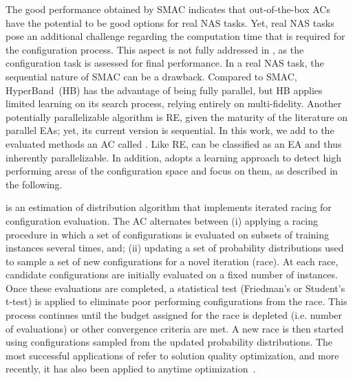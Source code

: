 The good performance obtained by SMAC indicates that out-of-the-box ACs have the potential to be good options for real NAS tasks.
Yet, real NAS tasks pose an additional challenge regarding the computation time that is required for the configuration process. This aspect is not fully addressed in \nasbench, as the configuration task is assessed for final performance. %
In a real NAS task, the sequential nature of SMAC can be a drawback. 
Compared to SMAC, HyperBand~(HB) has the advantage of being fully parallel, but HB applies limited learning on its search process, relying entirely on multi-fidelity. %
Another potentially parallelizable algorithm is RE, given the maturity of  the literature on parallel EAs; yet, its current version is sequential. 
In this work, we add to the evaluated methods an AC called \irace. Like RE, \irace can be classified as an EA and thus inherently parallelizable. In addition, \irace adopts a learning approach to detect high performing areas of the configuration space and focus on them, as described in the following.

\begin{description}[style=unboxed, leftmargin=0px]
\item[\irace] is an estimation of distribution algorithm
that implements iterated racing for configuration
evaluation.  The AC alternates
between (i) applying a racing procedure in which a
set of configurations is evaluated on subsets of training instances several times,
and; (ii) updating a set of probability
distributions used to sample a set of new configurations for a novel iteration (race). 
At each race, candidate configurations are initially evaluated on a fixed number of instances.
Once these evaluations are completed, a statistical test (Friedman's or Student's t-test) is applied to eliminate poor performing configurations from the race. 
This process continues until the budget assigned for the race is depleted (i.e. number of evaluations) or other convergence criteria are met. A new race is then started using configurations sampled from the updated probability distributions. The
most successful applications of \irace refer to solution quality optimization,
and more recently, it has also been applied to anytime optimization~\cite{LopStu2013ejor}.
\end{description}   


